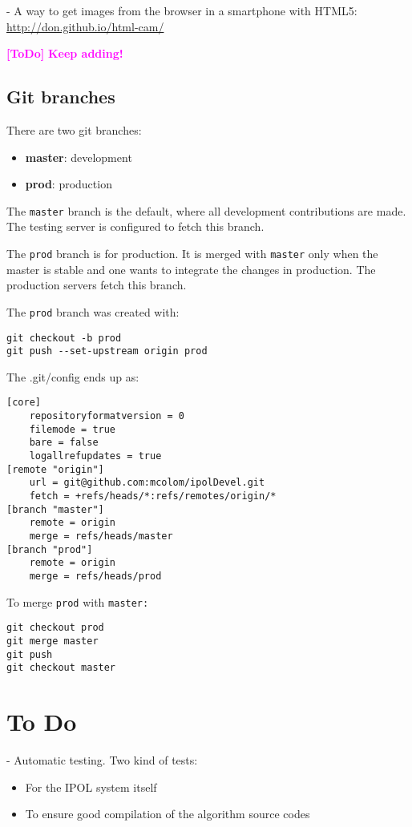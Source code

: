 \documentclass[a4paper,12pt]{article}
\newcommand{\ToDo}[1]{\textcolor{magenta}{\textbf{[ToDo]} \textbf{#1}}}
\begin{document}
- A way to get images from the browser in a smartphone with HTML5: \url{http://don.github.io/html-cam/}


\ToDo{Keep adding!}

\subsection{Git branches}
There are two git branches:

\begin{itemize}
  \item \textbf{master}: development
  \item \textbf{prod}: production
\end{itemize}

The {\tt master} branch is the default, where all development contributions are made. The testing server is configured to fetch this branch.

The {\tt prod} branch is for production. It is merged with {\tt master} only when the master is stable and one wants to integrate the changes in production. The production servers fetch this branch.

The {\tt prod} branch was created with:
\begin{verbatim}
git checkout -b prod
git push --set-upstream origin prod
\end{verbatim}

The .git/config ends up as:

\begin{verbatim}
[core]
	repositoryformatversion = 0
	filemode = true
	bare = false
	logallrefupdates = true
[remote "origin"]
	url = git@github.com:mcolom/ipolDevel.git
	fetch = +refs/heads/*:refs/remotes/origin/*
[branch "master"]
	remote = origin
	merge = refs/heads/master
[branch "prod"]
	remote = origin
	merge = refs/heads/prod
\end{verbatim}

To merge {\tt prod} with {\tt master:}
\begin{verbatim}
git checkout prod
git merge master
git push
git checkout master
\end{verbatim}


\section{To Do}
- Automatic testing. Two kind of tests:
\begin{itemize}
  \item For the IPOL system itself
  \item To ensure good compilation of the algorithm source codes
\end{itemize}
\end{document}
